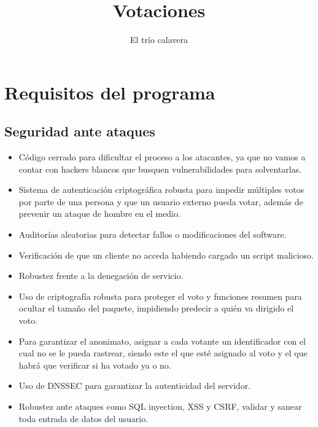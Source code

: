\documentclass{article}
\title{Votaciones}
\author{El trío calavera}
\begin{document}
\maketitle

\tableofcontents
\newpage

\section{Requisitos del programa}
\subsection{Seguridad ante ataques}
\begin{itemize}
    \item Código cerrado para dificultar el proceso a los atacantes, ya que no vamos a
    contar con hackers blancos que busquen vulnerabilidades para solventarlas.
    \item Sistema de autenticación criptográfica robusta para impedir múltiples votos 
    por parte de una persona y que un usuario externo pueda votar, además de prevenir
    un ataque de hombre en el medio.
    \item Auditorías aleatorias para detectar fallos o modificaciones del software.
    \item Verificación de que un cliente no acceda habiendo cargado un script malicioso.
    \item Robustez frente a la denegación de servicio.
    \item Uso de criptografía robusta para proteger el voto y funciones resumen para ocultar
    el tamaño del paquete, impidiendo predecir a quién va dirigido el voto.
    \item Para garantizar el anonimato, asignar a cada votante un identificador con el
    cual no se le pueda rastrear, siendo este el que esté asignado al voto y el que habrá
    que verificar si ha votado ya o no.
    \item Uso de DNSSEC para garantizar la autenticidad del servidor.
    \item Robustez ante ataques como SQL inyection, XSS y CSRF, validar y sanear toda entrada 
    de datos del usuario.
\end{itemize}
\end{document}
